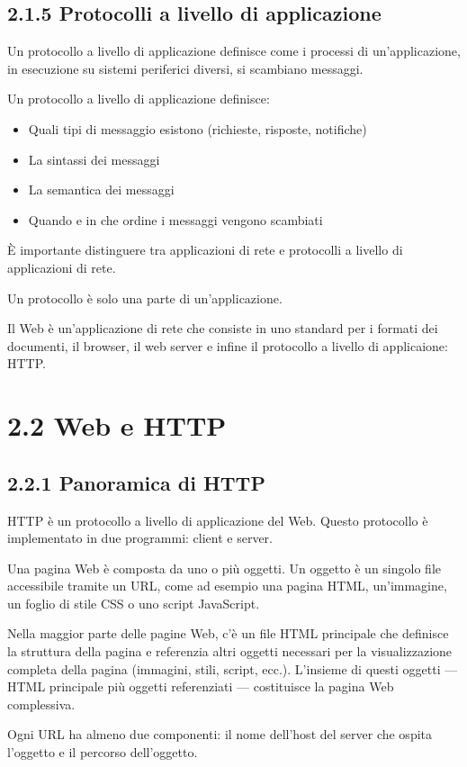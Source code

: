 \documentclass{book}
\begin{document}
\subsection*{2.1.5 Protocolli a livello di applicazione}
Un protocollo a livello di applicazione definisce come i processi di un'applicazione, in esecuzione su sistemi periferici diversi, si scambiano messaggi.

Un protocollo a livello di applicazione definisce:
\begin{itemize}
	\item Quali tipi di messaggio esistono (richieste, risposte, notifiche)
	\item La sintassi dei messaggi
	\item La semantica dei messaggi
	\item Quando e in che ordine i messaggi vengono scambiati
\end{itemize}

È importante distinguere tra applicazioni di rete e protocolli a livello di applicazioni di rete. 

Un protocollo è solo una parte di un'applicazione. 

Il Web è un'applicazione di rete che consiste in uno standard per i formati dei documenti, il browser, il web server e infine il protocollo a livello di applicaione: HTTP.

\section*{2.2 Web e HTTP}
\subsection*{2.2.1 Panoramica di HTTP}
HTTP è un protocollo a livello di applicazione del Web. Questo protocollo è implementato in due programmi: client e server.

Una pagina Web è composta da uno o più oggetti.
Un oggetto è un singolo file accessibile tramite un URL, come ad esempio una pagina HTML, un’immagine, un foglio di stile CSS o uno script JavaScript.

Nella maggior parte delle pagine Web, c’è un file HTML principale che definisce la struttura della pagina e referenzia altri oggetti necessari per la visualizzazione completa della pagina (immagini, stili, script, ecc.).
L’insieme di questi oggetti — HTML principale più oggetti referenziati — costituisce la pagina Web complessiva.

Ogni URL ha almeno due componenti: il nome dell'host del server che ospita l'oggetto e il percorso dell'oggetto.
\end{document}
